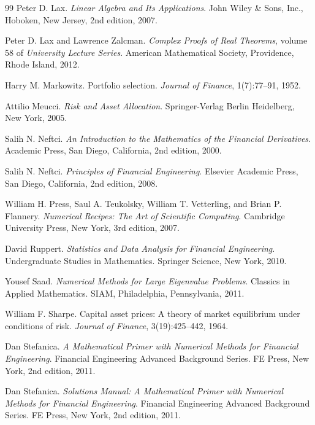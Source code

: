\begin{thebibliography}{99}
 Peter D. Lax. \textit{Linear Algebra and Its Applications}.
John Wiley \& Sons, Inc., Hoboken, New Jersey, 2nd edition, 2007.

 Peter D. Lax and Lawrence Zalcman. \textit{Complex Proofs of
Real Theorems}, volume 58 of \textit{University Lecture Series}. American
Mathematical Society, Providence, Rhode Island, 2012.

 Harry M. Markowitz. Portfolio selection. \textit{Journal of
Finance}, 1(7):77--91, 1952.

 Attilio Meucci. \textit{Risk and Asset Allocation}.
Springer-Verlag Berlin Heidelberg, New York, 2005.

 Salih N. Neftci. \textit{An Introduction to the Mathematics
of the Financial Derivatives}. Academic Press, San Diego, California, 2nd
edition, 2000.

 Salih N. Neftci. \textit{Principles of Financial
Engineering}. Elsevier Academic Press, San Diego, California, 2nd
edition, 2008.

 William H. Press, Saul A. Teukolsky, William T. Vetterling,
and Brian P. Flannery. \textit{Numerical Recipes: The Art of Scientific
Computing}. Cambridge University Press, New York, 3rd edition, 2007.

 David Ruppert. \textit{Statistics and Data Analysis for
Financial Engineering}. Undergraduate Studies in Mathematics. Springer
Science, New York, 2010.

 Yousef Saad. \textit{Numerical Methods for Large Eigenvalue
Problems}. Classics in Applied Mathematics. SIAM, Philadelphia,
Pennsylvania, 2011.

 William F. Sharpe. Capital asset prices: A theory of market
equilibrium under conditions of risk. \textit{Journal of Finance},
3(19):425--442, 1964.

 Dan Stefanica. \textit{A Mathematical Primer with Numerical
Methods for Financial Engineering}. Financial Engineering Advanced
Background Series. FE Press, New York, 2nd edition, 2011.

 Dan Stefanica. \textit{Solutions Manual: A Mathematical
Primer with Numerical Methods for Financial Engineering}. Financial
Engineering Advanced Background Series. FE Press, New York, 2nd edition,
2011.


\end{thebibliography}

